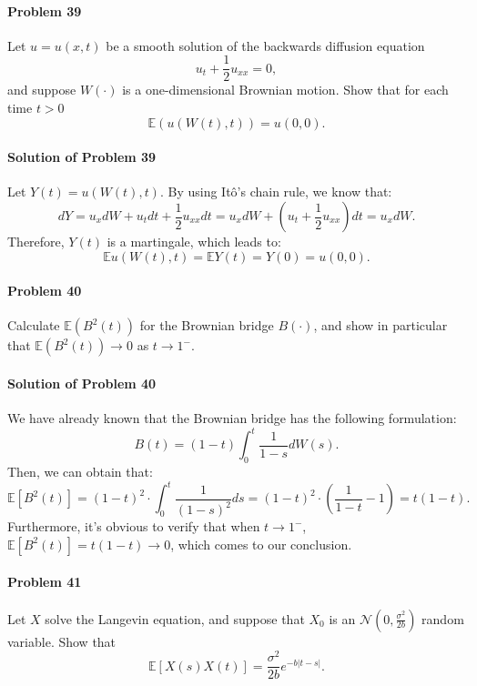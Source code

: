 \documentclass{article}
\begin{document}
\paragraph{Problem 39} Let $u=u(x,t)$ be a smooth solution of the backwards diffusion equation
\[u_t+\frac12 u_{xx}=0,\]
and suppose $W(\cdot)$ is a one-dimensional Brownian motion. Show that for each time $t>0$
\[\mathbb{E}(u(W(t),t)) = u(0,0).\]


\paragraph{Solution of Problem 39} Let $Y(t) = u(W(t),t)$. By using Itô's chain rule, we know that:
\[dY = u_x dW + u_t dt +\frac12 u_{xx} dt = u_x dW + (u_t+\frac12 u_{xx})dt = u_x dW.\]
Therefore, $Y(t)$ is a martingale, which leads to:
\[\mathbb{E} u(W(t),t)=\mathbb{E} Y(t) = Y(0)=u(0,0).\]


\paragraph{Problem 40} Calculate $\mathbb{E}(B^2(t))$ for the Brownian bridge $B(\cdot)$, and show in particular that $\mathbb{E}(B^2(t))\rightarrow 0$ as $t\rightarrow 1^{-}$.

\paragraph{Solution of Problem 40} We have already known that the Brownian bridge has the following formulation:
\[B(t)=(1-t)\int_0^t\frac{1}{1-s}dW(s).\]
Then, we can obtain that:
\[\mathbb{E}[B^2(t)]=(1-t)^2\cdot\int_0^t\frac{1}{(1-s)^2}ds = (1-t)^2\cdot\left(\frac{1}{1-t}-1\right)=t(1-t).\]
Furthermore, it's obvious to verify that when $t\rightarrow 1^-$, $\mathbb{E}[B^2(t)]=t(1-t)\rightarrow 0$, which comes to our conclusion. 

\paragraph{Problem 41} Let $X$ solve the Langevin equation, and suppose that $X_0$ is an $\mathcal N(0,\frac{\sigma^2}{2b})$ random variable. Show that 
\[\mathbb{E}[X(s)X(t)]=\frac{\sigma^2}{2b}e^{-b|t-s|}.\]
\end{document}
